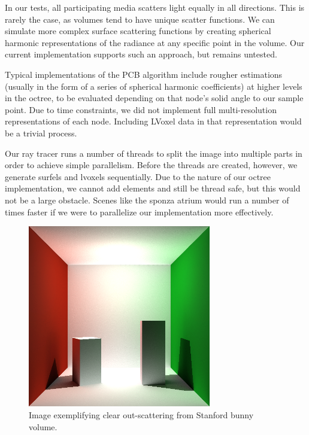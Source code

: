 \documentclass[12pt]{ucthesis}
\begin{document}
In our tests, all participating media scatters light equally in all directions.  This is rarely the case, as volumes tend to have unique scatter functions.  We can simulate more complex surface scattering functions by creating spherical harmonic representations of the radiance at any specific point in the volume.  Our current implementation supports such an approach, but remains untested.

Typical implementations of the PCB algorithm include rougher estimations (usually in the form of a series of spherical harmonic coefficients) at higher levels in the octree, to be evaluated depending on that node's solid angle to our sample point.  Due to time constraints, we did not implement full multi-resolution representations of each node.  Including LVoxel data in that representation would be a trivial process.

Our ray tracer runs a number of threads to split the image into multiple parts  in order to achieve simple parallelism.  Before the threads are created, however, we generate surfels and lvoxels sequentially.  Due to the nature of our octree implementation, we cannot add elements and still be thread safe, but this would not be a large obstacle.  Scenes like the sponza atrium would run a number of times faster if we were to parallelize our implementation more effectively.



\clearpage







\begin{figure}[h!]
    \centering
    \includegraphics[width=80mm]{img/indirect_box_high.png}
    \caption{Image exemplifying clear out-scattering from Stanford bunny volume.}
\end{figure}
\end{document}

